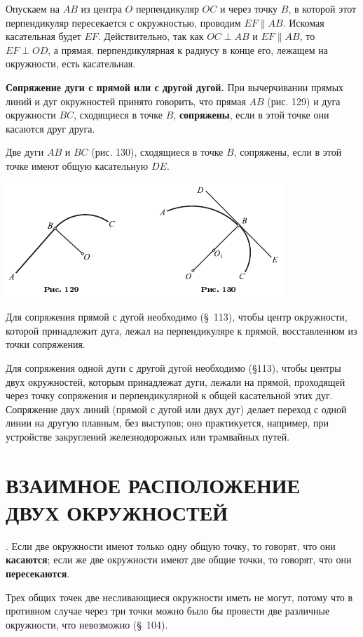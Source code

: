 \documentclass[oneside]{book}
\begin{document}
Опускаем на $AB$ из центра $O$ перпендикуляр $OC$ и через точку $B$, в которой этот перпендикуляр пересекается с окружностью, проводим $EF\parallel AB$.
Искомая касательная будет $EF$.
Действительно, так как $OC\perp AB$ и $EF\parallel AB$, то $EF\perp OD$, а прямая, перпендикулярная к радиусу в конце его, лежащем на окружности, есть касательная.

\textbf{Сопряжение дуги с прямой или с другой дугой.}
При вычерчивании прямых линий и дуг окружностей принято говорить, что прямая $AB$ (рис. 129) и дуга окружности $BC$, сходящиеся в точке $B$, \textbf{сопряжены}, если в этой точке они касаются друг друга.

Две дуги $AB$ и $BC$ (рис. 130), сходящиеся в точке $B$, сопряжены, если в этой точке имеют общую касательную $DE$.

\includegraphics{pics/ris-129-130}

Для сопряжения прямой с дугой необходимо (§~113), чтобы центр окружности, которой принадлежит дуга, лежал на перпендикуляре к прямой, восставленном из точки сопряжения.

Для сопряжения одной дуги с другой дугой необходимо (§113), чтобы центры двух окружностей, которым принадлежат дуги, лежали на прямой, проходящей через точку сопряжения и перпендикулярной к общей касательной этих дуг.
Сопряжение двух линий (прямой с дугой или двух дуг) делает переход с одной линии на другую плавным, без выступов;
оно практикуется, например, при устройстве закруглений железнодорожных или трамвайных путей.

\section{ВЗАИМНОЕ РАСПОЛОЖЕНИЕ ДВУХ ОКРУЖНОСТЕЙ}

.
Если две окружности имеют только одну общую точку, то говорят, что они \textbf{касаются};
если же две окружности имеют две общие точки, то говорят, что они \textbf{пересекаются}.

Трех общих точек две несливающиеся окружности иметь не могут, потому что в противном случае через три точки можно было бы провести две различные окружности, что невозможно (§~104).
\end{document}
